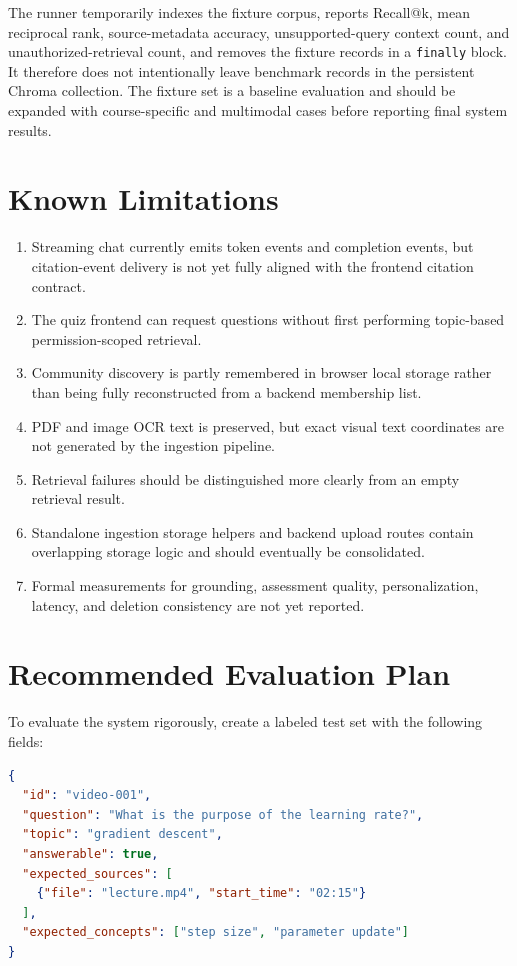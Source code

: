 \documentclass[11pt,a4paper]{article}
\begin{document}
The runner temporarily indexes the fixture corpus, reports Recall@k, mean
reciprocal rank, source-metadata accuracy, unsupported-query context count,
and unauthorized-retrieval count, and removes the fixture records in a
\texttt{finally} block. It therefore does not intentionally leave benchmark
records in the persistent Chroma collection. The fixture set is a baseline
evaluation and should be expanded with course-specific and multimodal cases
before reporting final system results.

\section{Known Limitations}

\begin{enumerate}[leftmargin=*]
  \item Streaming chat currently emits token events and completion events, but
        citation-event delivery is not yet fully aligned with the frontend
        citation contract.
  \item The quiz frontend can request questions without first performing
        topic-based permission-scoped retrieval.
  \item Community discovery is partly remembered in browser local storage
        rather than being fully reconstructed from a backend membership list.
  \item PDF and image OCR text is preserved, but exact visual text coordinates
        are not generated by the ingestion pipeline.
  \item Retrieval failures should be distinguished more clearly from an empty
        retrieval result.
  \item Standalone ingestion storage helpers and backend upload routes contain
        overlapping storage logic and should eventually be consolidated.
  \item Formal measurements for grounding, assessment quality, personalization,
        latency, and deletion consistency are not yet reported.
\end{enumerate}

\section{Recommended Evaluation Plan}

To evaluate the system rigorously, create a labeled test set with the
following fields:

\begin{lstlisting}[language=json,caption={Suggested evaluation record}]
{
  "id": "video-001",
  "question": "What is the purpose of the learning rate?",
  "topic": "gradient descent",
  "answerable": true,
  "expected_sources": [
    {"file": "lecture.mp4", "start_time": "02:15"}
  ],
  "expected_concepts": ["step size", "parameter update"]
}
\end{lstlisting}
\end{document}
